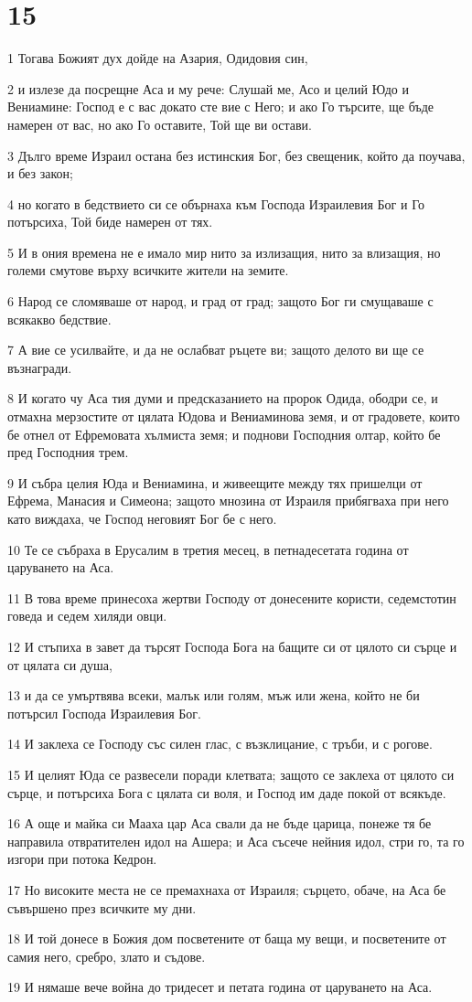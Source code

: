 \chapter{15}

\par 1 Тогава Божият дух дойде на Азария, Одидовия син,
\par 2 и излезе да посрещне Аса и му рече: Слушай ме, Асо и целий Юдо и Вениамине: Господ е с вас докато сте вие с Него; и ако Го търсите, ще бъде намерен от вас, но ако Го оставите, Той ще ви остави.
\par 3 Дълго време Израил остана без истинския Бог, без свещеник, който да поучава, и без закон;
\par 4 но когато в бедствието си се обърнаха към Господа Израилевия Бог и Го потърсиха, Той биде намерен от тях.
\par 5 И в ония времена не е имало мир нито за излизащия, нито за влизащия, но големи смутове върху всичките жители на земите.
\par 6 Народ се сломяваше от народ, и град от град; защото Бог ги смущаваше с всякакво бедствие.
\par 7 А вие се усилвайте, и да не ослабват ръцете ви; защото делото ви ще се възнагради.
\par 8 И когато чу Аса тия думи и предсказанието на пророк Одида, ободри се, и отмахна мерзостите от цялата Юдова и Вениаминова земя, и от градовете, които бе отнел от Ефремовата хълмиста земя; и поднови Господния олтар, който бе пред Господния трем.
\par 9 И събра целия Юда и Вениамина, и живеещите между тях пришелци от Ефрема, Манасия и Симеона; защото мнозина от Израиля прибягваха при него като виждаха, че Господ неговият Бог бе с него.
\par 10 Те се събраха в Ерусалим в третия месец, в петнадесетата година от царуването на Аса.
\par 11 В това време принесоха жертви Господу от донесените користи, седемстотин говеда и седем хиляди овци.
\par 12 И стъпиха в завет да търсят Господа Бога на бащите си от цялото си сърце и от цялата си душа,
\par 13 и да се умъртвява всеки, малък или голям, мъж или жена, който не би потърсил Господа Израилевия Бог.
\par 14 И заклеха се Господу със силен глас, с възклицание, с тръби, и с рогове.
\par 15 И целият Юда се развесели поради клетвата; защото се заклеха от цялото си сърце, и потърсиха Бога с цялата си воля, и Господ им даде покой от всякъде.
\par 16 А още и майка си Мааха цар Аса свали да не бъде царица, понеже тя бе направила отвратителен идол на Ашера; и Аса съсече нейния идол, стри го, та го изгори при потока Кедрон.
\par 17 Но високите места не се премахнаха от Израиля; сърцето, обаче, на Аса бе съвършено през всичките му дни.
\par 18 И той донесе в Божия дом посветените от баща му вещи, и посветените от самия него, сребро, злато и съдове.
\par 19 И нямаше вече война до тридесет и петата година от царуването на Аса.

